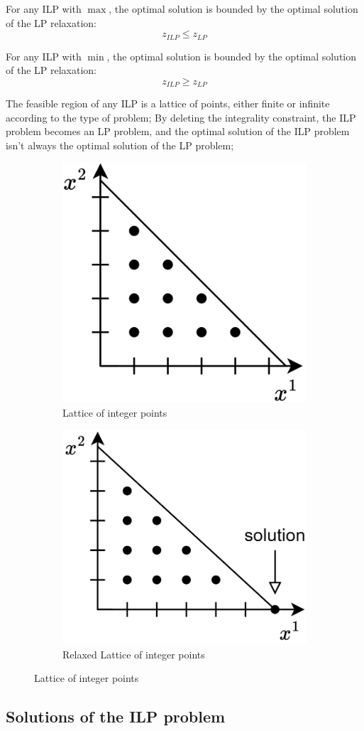 \begin{property}  
    For any ILP with $\max$, the optimal solution is bounded by the optimal solution of the LP relaxation:
    \[ z_{ILP} \leq z_{LP} \]
  
    For any ILP with $\min$, the optimal solution is bounded by the optimal solution of the LP relaxation:
    \[ z_{ILP} \geq z_{LP} \]
\end{property}
The feasible region of any ILP is a lattice of points, either finite or infinite according to the type of problem;
By deleting the integrality constraint, the ILP problem becomes an LP problem, and the optimal solution of the ILP problem isn't always the optimal solution of the LP problem;
\begin{figure}[H]
    \centering
    \begin{subfigure}[b]{0.495\textwidth}
        \centering
        \includegraphics[width=0.25\linewidth]{images/ilp.png}
        \caption{Lattice of integer points}
    \end{subfigure}
    \begin{subfigure}[b]{0.495\textwidth}
        \centering
        \includegraphics[width=0.25\linewidth]{images/ilp1.png}
        \caption{Relaxed Lattice of integer points}
    \end{subfigure}
    \caption{Lattice of integer points}
\end{figure}
  
\subsection{Solutions of the ILP problem}

